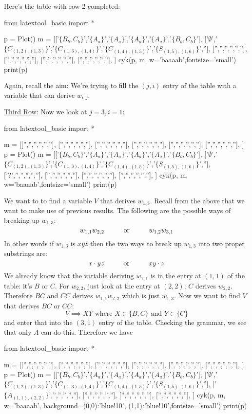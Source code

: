 Here's the table with row 2 completed:
\begin{python}
from latextool_basic import *

p = Plot()
m = [['$\{B_b,C_b\}$','$\{A_a\}$','$\{A_a\}$','$\{A_a\}$','$\{A_a\}$','$\{B_b,C_b\}$'],
     ['$\emptyset$','$\{C_{(1,2),(1,3)}\}$','$\{C_{(1,3),(1,4)}\}$','$\{C_{(1,4),(1,5)}\}$','$\{S_{(1,5),(1,6)}\}$',''],
     ['','','','','',''],
     ['','','','','',''],
     ['','','','','',''],
     ['','','','','',''],
     ]
cyk(p, m, w='baaaab',fontsize='small')
print(p)
\end{python}

Again, recall the aim: We're trying to fill the $(j,i)$ 
entry of the table with a variable that can derive $w_{i,j}$.

\underline{Third Row}:
Now we look at $j = 3, i = 1$:
\begin{python}
from latextool_basic import *

m = [['','','','','',''],
     ['','','','','',''],
     ['','','','','',''],
     ['','','','','',''],
     ['','','','','',''],
     ['','','','','',''],
     ]
p = Plot()
m = [['$\{B_b,C_b\}$','$\{A_a\}$','$\{A_a\}$','$\{A_a\}$','$\{A_a\}$','$\{B_b,C_b\}$'],
     ['$\emptyset$','$\{C_{(1,2),(1,3)}\}$','$\{C_{(1,3),(1,4)}\}$','$\{C_{(1,4),(1,5)}\}$','$\{S_{(1,5),(1,6)}\}$',''],
     ['?','','','','',''],
     ['','','','','',''],
     ['','','','','',''],
     ['','','','','',''],
     ]
cyk(p, m, w='baaaab',fontsize='small')
print(p)
\end{python}
We want to to find a variable $V$ that derives $w_{1,3}$.
Recall from the above that we want to make use of previous results.
The following are the possible ways of breaking up $w_{1,3}$:
\[
w_{1,1}w_{2,2} \hskip 1cm \text{or} \hskip 1cm w_{1,2} w_{3,1}
\]
In other words if $w_{1, 3}$ is $xyz$ then the two ways to break up 
$w_{1,3}$ into two proper substrings are:
\[
x \cdot yz \hskip 1cm \text{or} \hskip 1cm  xy \cdot z
\]
We already know that the variable deriving $w_{1,1}$ is in the
entry at $(1,1)$ of the table: it's $B$ or $C$.
For $w_{2,2}$, just look at the entry at $(2,2)$; $C$ derives 
$w_{2,2}$.
Therefore $BC$ and $CC$ derives $w_{1,1}w_{2,2}$ which is just 
$w_{1, 3}$.
Now we want to find $V$ that derives $BC$ or $CC$:
\[
  V \implies XY \text{ where } X \in \{B, C\} \text{ and } Y \in \{C\} 
\]
and enter that
into the $(3,1)$ entry of the table.
Checking the grammar, we see that only $A$ can do this.
Therefore we have
\begin{python}
from latextool_basic import *

m = [['','','','','',''],
     ['','','','','',''],
     ['','','','','',''],
     ['','','','','',''],
     ['','','','','',''],
     ['','','','','',''],
     ]
p = Plot()
m = [['$\{B_b,C_b\}$','$\{A_a\}$','$\{A_a\}$','$\{A_a\}$','$\{A_a\}$','$\{B_b,C_b\}$'],
     ['$\emptyset$','$\{C_{(1,2),(1,3)}\}$','$\{C_{(1,3),(1,4)}\}$','$\{C_{(1,4),(1,5)}\}$','$\{S_{(1,5),(1,6)}\}$',''],
     ['$\{A_{(1,1),(2,2)}\}$','','','','',''],
     ['','','','','',''],
     ['','','','','',''],
     ['','','','','',''],
     ]
cyk(p, m, w='baaaab', background={(0,0):'blue!10', (1,1):'blue!10'},fontsize='small')
print(p)
\end{python}
